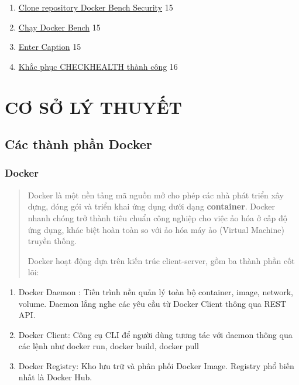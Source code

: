 \begin{enumerate}
\def\labelenumi{\arabic{enumi}.}
\item
  \hyperref[_bookmark27]{Clone repository Docker Bench Security} 15
\item
  \hyperref[_bookmark28]{Chạy Docker Bench} 15
\item
  \hyperref[_bookmark29]{Enter Caption} 15
\item
  \hyperref[_bookmark30]{Khắc phục CHECKHEALTH thành công} 16
\end{enumerate}

\section{CƠ SỞ LÝ THUYẾT}\label{cux1a1-sux1edf-luxfd-thuyux1ebft}

\subsection{Các thành phần Docker}\label{cuxe1c-thuxe0nh-phux1ea7n-docker}

\subsubsection{Docker}\label{docker}

\begin{quote}
Docker là một nền tảng mã nguồn mở cho phép các nhà phát triển xây dựng, đóng gói và triển khai ứng dụng dưới dạng \textbf{container}. Docker nhanh chóng trở thành tiêu chuẩn công nghiệp cho việc ảo hóa ở cấp độ ứng dụng, khác biệt hoàn toàn so với ảo hóa máy ảo (Virtual Machine) truyền thống.

Docker hoạt động dựa trên kiến trúc client-server, gồm ba thành phần cốt lõi:
\end{quote}

\begin{enumerate}
\def\labelenumi{(\arabic{enumi})}
\item
  Docker Daemon : Tiến trình nền quản lý toàn bộ container, image, network, volume. Daemon lắng nghe các yêu cầu từ Docker Client thông qua REST API.
\item
  Docker Client: Công cụ CLI để người dùng tương tác với daemon thông qua các lệnh như docker run, docker build, docker pull
\item
  Docker Registry: Kho lưu trữ và phân phối Docker Image. Registry phổ biến nhất là Docker Hub.
\end{enumerate}

